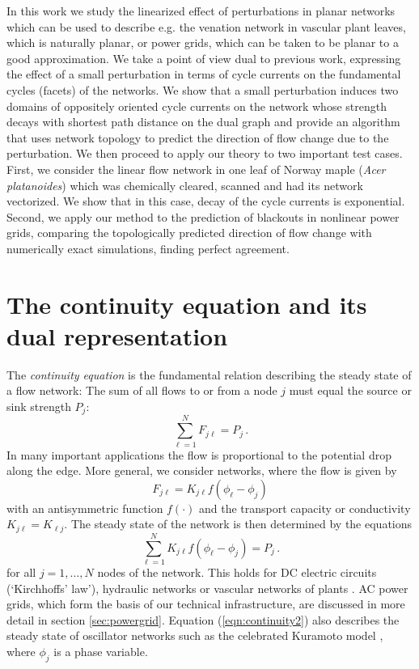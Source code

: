\documentclass[10pt,aps,pra,twocolumn,superscriptaddress]{revtex4-1}
\newcommand{\be}{\begin{equation}}
\newcommand{\ee}{\end{equation}}
\begin{document}
In this work we study the linearized effect of perturbations 
in planar networks which can be used to describe e.g. the venation
network in vascular plant leaves, which is naturally planar, or
power grids, which can be taken to be planar to a good approximation.
We take a point of view dual to previous work, expressing the
effect of a small perturbation in terms of cycle currents on the
fundamental cycles (facets) of the networks.
We show that a small perturbation induces two domains of oppositely
oriented cycle currents on the network whose strength decays
with shortest path distance on the dual graph and provide an
algorithm that uses network topology to predict the direction
of flow change due to the perturbation.
We then proceed to apply our theory to two important test cases.
First, we consider the linear flow network in one leaf of
Norway maple (\emph{Acer platanoides}) which was chemically cleared,
scanned and had its network vectorized. We show that in this case,
decay of the cycle currents is exponential.
Second, we apply our method to the prediction of blackouts in nonlinear
power grids, comparing the topologically predicted direction of
flow change with numerically exact simulations, finding perfect
agreement.

\section{The continuity equation and its dual representation}
\label{sec:continuity}

The \emph{continuity equation} is the fundamental relation describing the steady state of a flow network: The sum of all flows to or from a node $j$ must equal the source or sink strength $P_j$:
\be
   \sum_{\ell=1}^N F_{j \ell} = P_j \, .
   \label{eqn:continuity1}
\ee
In many important applications the flow is proportional to the potential drop along the edge. More general, we consider networks, where the flow is given by
\be
   F_{j \ell} = K_{j \ell} f(\phi_\ell - \phi_j)
    \label{eqn:flow-pot}
\ee
with an antisymmetric function $f(\cdot)$ and the transport capacity or conductivity $K_{j\ell} = K_{\ell j}$. The steady state of the network is then determined by the equations
\be
    \sum_{\ell=1}^N K_{j \ell} f(\phi_\ell - \phi_j) = P_j \, .
    \label{eqn:continuity2}
\ee
for all $j = 1,\ldots, N$ nodes of the network. This holds for DC electric circuits (`Kirchhoffs' law'), hydraulic networks \cite{Dura04} or vascular networks of plants \cite{Kati10}. AC power grids, which form the basis of our technical infrastructure, are discussed in more detail in section \ref{sec:powergrid}. Equation (\ref{eqn:continuity2}) also describes the steady state of oscillator networks such as the celebrated Kuramoto model \cite{Kura84,Stro00,Aceb05}, where $\phi_j$ is a phase variable.
\end{document}
